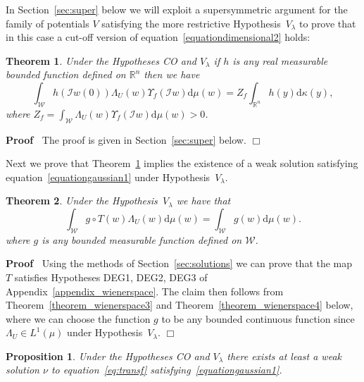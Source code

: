 \documentclass[a4paper,10pt]{article}
\newcommand{\mathd}{\mathrm{d}}
\newenvironment{proof}{\noindent\textbf{Proof\ }}{\hspace*{\fill}$\Box$\medskip}
\newtheorem{proposition}{Proposition}
{\theorembodyfont{\rmfamily}\newtheorem{remark}{Remark}}
\newtheorem{theorem}{Theorem}
\begin{document}
In Section~\ref{sec:super} below we will exploit a supersymmetric argument for
the family of potentials $V$ satisfying the more restrictive
Hypothesis~$V_{\lambda}$ to prove that in this case a cut-off version of
equation~{\eqref{equationdimensional2}} holds:

\begin{theorem}
  \label{theorem_main1}Under the Hypotheses CO and $V_{\lambda}$ if $h$ is any
  real measurable bounded function defined on $\mathbb{R}^n$ then we have
  \[ \int_{\mathcal{W}} h (\mathcal{I}w (0)) \Lambda_U (w) \Upsilon_f
     (\mathcal{I}w) \mathd \mu (w) = Z_f \int_{\mathbb{R}^n} h (y) \mathd
     \kappa (y), \]
  where $Z_f = \int_{\mathcal{W}} \Lambda_U (w) \Upsilon_f (\mathcal{I}w)
  \mathd \mu (w) > 0$.
\end{theorem}

\begin{proof}
  The proof is given in Section~\ref{sec:super} below.
\end{proof}

Next we prove that Theorem~\ref{theorem_main1} implies the existence of a weak
solution satisfying equation~{\eqref{equationgaussian1}} under
Hypothesis~$V_{\lambda}$.

\begin{theorem}
  \label{theorem_lambda2}Under the Hypothesis~$V_{\lambda}$ we have that
  \begin{equation}
    \int_{\mathcal{W}} g \circ T (w) \Lambda_U (w) \mathd \mu (w) =
    \int_{\mathcal{W}} g (w) \mathd \mu (w) . \label{equationreduction5}
  \end{equation}
  where $g$ is any bounded measurable function defined on $\mathcal{W}$. 
\end{theorem}

\begin{proof}
  Using the methods of Section~\ref{sec:solutions} we can prove that the map
  $T$ satisfies Hypotheses DEG1, DEG2, DEG3 of
  Appendix~\ref{appendix_wienerspace}. The claim then follows from
  Theorem~\ref{theorem_wienerspace3} and Theorem~\ref{theorem_wienerspace4}
  below, where we can choose the function $g$ to be any bounded continuous
  function since $\Lambda_U \in L^1 (\mu)$ under Hypothesis~$V_{\lambda}$.
\end{proof}

\begin{proposition}
  \label{proposition_reduction1}Under the Hypotheses CO and $V_{\lambda}$
  there exists at least a weak solution $\nu$ to equation~{\eqref{eq:transf}}
  satisfying~{\eqref{equationgaussian1}}.
\end{proposition}
\end{document}
